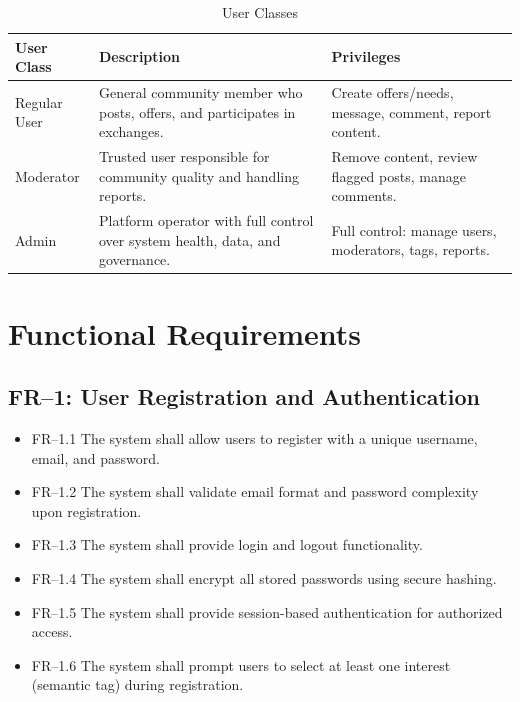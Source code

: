 \documentclass[10pt,a4paper]{report}
\begin{document}
\begin{table}[h]
    \centering
    \begin{tabularx}{\textwidth}{|l|X|X|}
        \hline
        \textbf{User Class}   & \textbf{Description}                                                                  & \textbf{Privileges}                                              \\
        \hline
        Regular User          & General community member who posts, offers, and participates in exchanges.            & Create offers/needs, message, comment, report content.           \\
        \hline
        Moderator             & Trusted user responsible for community quality and handling reports.                  & Remove content, review flagged posts, manage comments.           \\
        \hline
        Admin                 & Platform operator with full control over system health, data, and governance.         & Full control: manage users, moderators, tags, reports.           \\
        \hline
    \end{tabularx}
    \caption{User Classes}
\end{table}

\section{Functional Requirements}

\subsection{FR--1: User Registration and Authentication}
\begin{itemize}
    \item FR--1.1 The system shall allow users to register with a unique username, email, and password.
    \item FR--1.2 The system shall validate email format and password complexity upon registration.
    \item FR--1.3 The system shall provide login and logout functionality.
    \item FR--1.4 The system shall encrypt all stored passwords using secure hashing.
    \item FR--1.5 The system shall provide session-based authentication for authorized access.
    \item FR--1.6 The system shall prompt users to select at least one interest (semantic tag) during registration.
\end{itemize}
\end{document}
